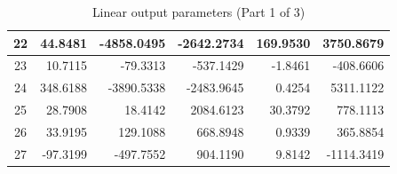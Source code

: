 \documentclass[12pt]{article}
\begin{document}
\begin{table}[H]
\begin{tabular}{|c|r|r|r|r|r|}
22 & 44.8481 & -4858.0495 & -2642.2734 & 169.9530 & 3750.8679 \\ \hline
23 & 10.7115 & -79.3313 & -537.1429 & -1.8461 & -408.6606 \\ \hline
24 & 348.6188 & -3890.5338 & -2483.9645 & 0.4254 & 5311.1122 \\ \hline
25 & 28.7908 & 18.4142 & 2084.6123 & 30.3792 & 778.1113 \\ \hline
26 & 33.9195 & 129.1088 & 668.8948 & 0.9339 & 365.8854 \\ \hline
27 & -97.3199 & -497.7552 & 904.1190 & 9.8142 & -1114.3419 \\ \hline
\end{tabular}
\label{tab:linearBa1}
\caption{Linear output parameters (Part 1 of 3)}
\end{table}
\end{document}
